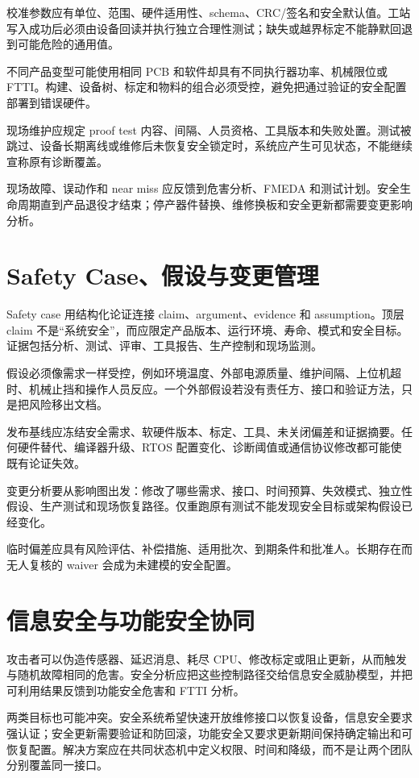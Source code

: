 校准参数应有单位、范围、硬件适用性、schema、CRC/签名和安全默认值。工站写入成功后必须由设备回读并执行独立合理性测试；缺失或越界标定不能静默回退到可能危险的通用值。

不同产品变型可能使用相同 PCB 和软件却具有不同执行器功率、机械限位或 FTTI。构建、设备树、标定和物料的组合必须受控，避免把通过验证的安全配置部署到错误硬件。

现场维护应规定 proof test 内容、间隔、人员资格、工具版本和失败处置。测试被跳过、设备长期离线或维修后未恢复安全锁定时，系统应产生可见状态，不能继续宣称原有诊断覆盖。

现场故障、误动作和 near miss 应反馈到危害分析、FMEDA 和测试计划。安全生命周期直到产品退役才结束；停产器件替换、维修换板和安全更新都需要变更影响分析。

\section{Safety Case、假设与变更管理}

Safety case 用结构化论证连接 claim、argument、evidence 和 assumption。顶层 claim 不是“系统安全”，而应限定产品版本、运行环境、寿命、模式和安全目标。证据包括分析、测试、评审、工具报告、生产控制和现场监测。

假设必须像需求一样受控，例如环境温度、外部电源质量、维护间隔、上位机超时、机械止挡和操作人员反应。一个外部假设若没有责任方、接口和验证方法，只是把风险移出文档。

发布基线应冻结安全需求、软硬件版本、标定、工具、未关闭偏差和证据摘要。任何硬件替代、编译器升级、RTOS 配置变化、诊断阈值或通信协议修改都可能使既有论证失效。

变更分析要从影响图出发：修改了哪些需求、接口、时间预算、失效模式、独立性假设、生产测试和现场恢复路径。仅重跑原有测试不能发现安全目标或架构假设已经变化。

临时偏差应具有风险评估、补偿措施、适用批次、到期条件和批准人。长期存在而无人复核的 waiver 会成为未建模的安全配置。

\section{信息安全与功能安全协同}

攻击者可以伪造传感器、延迟消息、耗尽 CPU、修改标定或阻止更新，从而触发与随机故障相同的危害。安全分析应把这些控制路径交给信息安全威胁模型，并把可利用结果反馈到功能安全危害和 FTTI 分析。

两类目标也可能冲突。安全系统希望快速开放维修接口以恢复设备，信息安全要求强认证；安全更新需要验证和防回滚，功能安全又要求更新期间保持确定输出和可恢复配置。解决方案应在共同状态机中定义权限、时间和降级，而不是让两个团队分别覆盖同一接口。

